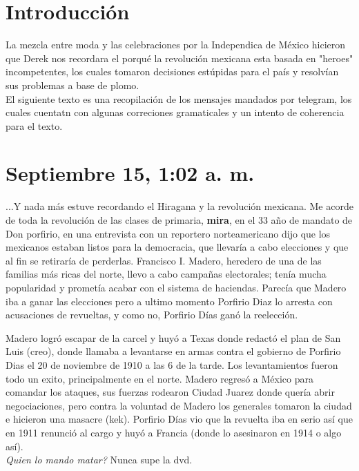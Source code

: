 \documentclass{article}
\begin{document}
\section*{Introducción}
La mezcla entre moda y las celebraciones por la Independica de México
hicieron que Derek nos recordara el porqué la revolución mexicana esta basada en
"heroes" incompetentes, los cuales tomaron decisiones estúpidas para el país y
resolvían sus problemas a base de plomo.\\
El siguiente texto es una recopilación de los mensajes mandados por telegram,
los cuales cuentatn con algunas correciones gramaticales y un intento de coherencia para el texto.
\section*{Septiembre 15, 1:02 a. m.}
    ...Y nada más estuve recordando el Hiragana y la revolución mexicana. Me acorde de toda la revolución de las clases de primaria, \textbf{mira},
en el 33 año de mandato de Don porfirio, en una entrevista con un reportero norteamericano dijo que los mexicanos estaban listos para la democracia,
que llevaría a cabo elecciones y que al fin se retiraría de perderlas. Francisco I. Madero, heredero de una de las familias más ricas del norte, llevo a cabo
campañas electorales; tenía mucha popularidad y prometía acabar con el sistema de haciendas. Parecía que Madero iba a ganar las elecciones
pero a ultimo momento Porfirio Diaz lo arresta con acusaciones de revueltas, y como no, Porfirio Días ganó la reelección.

Madero logró escapar de la carcel y huyó a Texas donde redactó el plan de San Luis (creo), donde llamaba a levantarse en armas contra
el gobierno de Porfirio Dias el 20 de noviembre de 1910 a las 6 de la tarde. Los levantamientos fueron todo un exito, principalmente en el norte. Madero
regresó a México para comandar los ataques, sus fuerzas rodearon Ciudad Juarez donde quería abrir negociaciones, pero contra la voluntad de Madero
los generales tomaron la ciudad e hicieron una masacre (kek). Porfirio Días vio que la revuelta iba en serio así que en 1911 renunció al cargo y huyó a
Francia (donde lo asesinaron en 1914 o algo así).\\
\textit{Quien lo mando matar?} Nunca supe la dvd.
\end{document}
